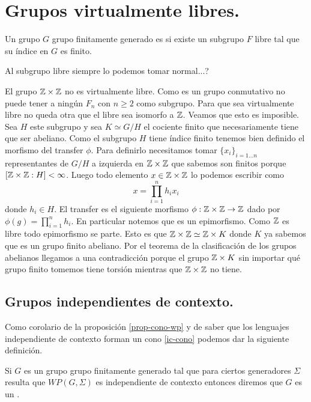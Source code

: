 \documentclass[tesis.tex]{subfiles}
\newcommand{\ic}{independiente de contexto }
\newcommand{\fg}{grupo finitamente generado }
\begin{document}
	
\chapter{Grupos virtualmente libres.}
\begin{deff}
Un grupo $G$ \fg es  si existe un subgrupo $F$ libre tal que su índice en $G$ es finito.
\end{deff}

\begin{obs}
	Al subgrupo libre siempre lo podemos tomar normal...?
\end{obs}

\begin{ej}
	El grupo $\mathbb Z \times \mathbb Z$ no es virtualmente libre.
	Como es un grupo conmutativo no puede tener a ningún $F_n$ con $n \ge 2$ como subgrupo. 
	Para que sea virtualmente libre no queda otra que el libre sea isomorfo a $\mathbb Z$. 
	Veamos que esto es imposible.
	Sea $H$ este subgrupo y sea $K \simeq G/H$ el cociente finito que necesariamente tiene que ser abeliano.
	Como el subgrupo $H$ tiene índice finito tenemos bien definido el morfismo del transfer $\phi$.
	Para definirlo necesitamos tomar $\{ x_i \}_{i=1 \dots n}$ representantes de $G/H$ a izquierda en $\mathbb Z \times \mathbb Z$ que sabemos son finitos porque $[\mathbb Z \times \mathbb Z : H] < \infty$.
	Luego todo elemento $x \in \mathbb Z \times \mathbb Z$ lo podemos escribir como 
	\[
	x = \prod_{i=1}^{n} h_i x_i
	\]
	donde $h_i \in H$.
	El transfer es el siguiente morfismo $\phi: \mathbb Z \times \mathbb Z \to \mathbb Z$ dado por $\phi(g) = \prod_{i=1}^{n} h_i$.
	En particular notemos que es un epimorfismo.
	Como $\mathbb Z$ es libre todo epimorfismo se parte. 
	Esto es que $\mathbb Z \times \mathbb Z  \simeq \mathbb Z \times K$ donde $K$ ya sabemos que es un grupo finito abeliano.
	Por el teorema de la clasificación de los grupos abelianos llegamos a una contradicción porque el grupo $\mathbb Z \times K$ sin importar qué grupo finito tomemos tiene torsión mientras que $\mathbb Z \times \mathbb Z$ no tiene.	
\end{ej}






\section{Grupos independientes de contexto.}
 
Como corolario de la proposición \ref{prop-cono-wp} y de saber que los lenguajes \ic forman un cono \ref{ic-cono} podemos dar la siguiente definición.
\medskip
\begin{deff}
	Si $G$ es un grupo \fg tal que para ciertos generadores $\Sigma$ resulta que $WP(G, \Sigma)$ es independiente de contexto entonces diremos que $G$ es un \blue{grupo \ic }.
\end{deff}
\end{document}
